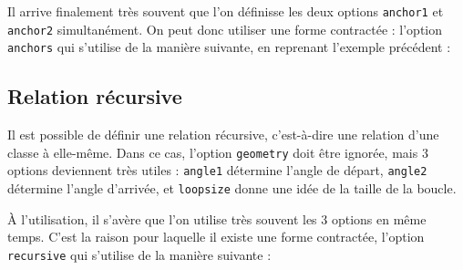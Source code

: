 \documentclass[a4paper,11pt]{report}
\newcommand{\inputTikZ}[1]{%
  }%
\newcommand{\inputTikZ}[1]{%
    \texttt{[image: fig/\#1.pdf]}%
  }%
\begin{document}
\begin{center}
\inputTikZ{figure21}
\end{center}

Il arrive finalement très souvent que l'on définisse les deux options {\tt anchor1} et {\tt anchor2} simultanément. On peut donc utiliser une forme contractée : l'option \hypertarget{anchors}{{\tt anchors}} qui s'utilise de la manière suivante, en reprenant l'exemple précédent :

\medskip

\begin{minipage}{0.6\textwidth}

\end{minipage}
\begin{minipage}{0.4\textwidth}
\begin{center}
\inputTikZ{figure22}
\end{center}
\end{minipage}

\subsection{Relation récursive}\label{ss.relrec}

Il est possible de définir une relation récursive, c'est-à-dire une relation d'une classe à elle-même. Dans ce cas, l'option {\tt geometry} doit être ignorée, mais 3 options deviennent très utiles : {\tt angle1} détermine l'angle de départ, {\tt angle2} détermine l'angle d'arrivée, et {\tt loopsize} donne une idée de la taille de la boucle.

\medskip

\begin{minipage}{0.5\textwidth}

\end{minipage}
\begin{minipage}{0.4\textwidth}
\begin{center}
\inputTikZ{figure23}
\end{center}
\end{minipage}

\medskip

\`{A} l'utilisation, il s'avère que l'on utilise très souvent les 3 options en même temps. C'est la raison pour laquelle il existe une forme contractée, l'option {\tt recursive} qui s'utilise de la manière suivante :

\medskip

\begin{minipage}{0.5\textwidth}

\end{minipage}
\begin{minipage}{0.4\textwidth}
\begin{center}
\inputTikZ{figure24}
\end{center}
\end{minipage}
\end{document}
